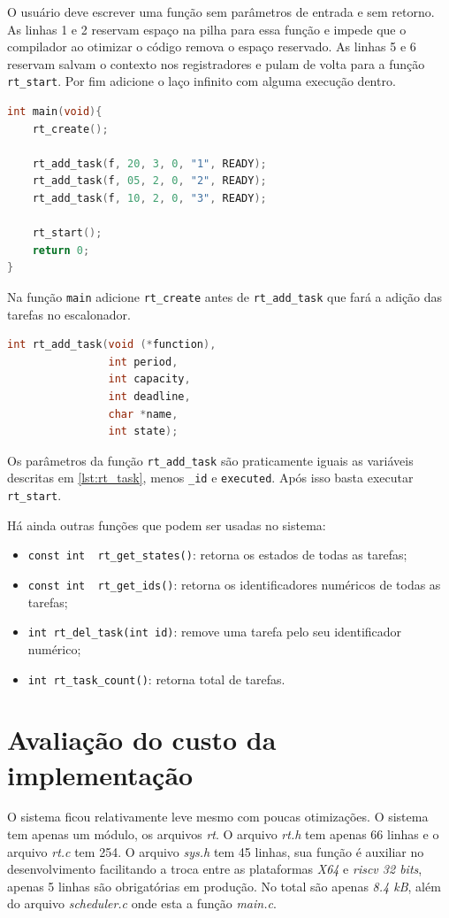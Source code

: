 \documentclass[a4 paper]{article}
\begin{document}
O usuário deve escrever uma função sem parâmetros de entrada e sem retorno. As linhas 1 e 2 reservam espaço na pilha para essa função e impede que o compilador ao otimizar o código remova o espaço reservado. As linhas 5 e 6 reservam salvam o contexto nos registradores e pulam de volta para a função \verb|rt_start|. Por fim adicione o laço infinito com alguma execução dentro.

\begin{lstlisting}[captionpos=b, language=C, caption=Exemplo de uso]
int main(void){
    rt_create();

    rt_add_task(f, 20, 3, 0, "1", READY);
    rt_add_task(f, 05, 2, 0, "2", READY);
    rt_add_task(f, 10, 2, 0, "3", READY);

    rt_start();
    return 0;
}
\end{lstlisting}

Na função \verb|main| adicione \verb|rt_create| antes de \verb|rt_add_task| que fará a adição das tarefas no escalonador.
\begin{lstlisting}[captionpos=b, language=C, caption=Função de adição das tarefas]
int rt_add_task(void (*function), 
                int period, 
                int capacity, 
                int deadline, 
                char *name,  
                int state);
\end{lstlisting}

Os parâmetros da função \verb|rt_add_task| são praticamente iguais as variáveis descritas em \ref{lst:rt_task}, menos \verb|_id| e \verb|executed|. Após isso basta executar \verb|rt_start|.

Há ainda outras funções que podem ser usadas no sistema:
\begin{itemize}
    \item \verb|const int  rt_get_states()|: retorna os estados de todas as tarefas;
    \item \verb|const int  rt_get_ids()|: retorna os identificadores numéricos de todas as tarefas;
    \item \verb|int rt_del_task(int id)|: remove uma tarefa pelo seu identificador numérico;
    \item \verb|int rt_task_count()|: retorna total de tarefas.
\end{itemize}

\section{Avaliação do custo da implementação}
O sistema ficou relativamente leve mesmo com poucas otimizações. O sistema tem apenas um módulo, os arquivos \textit{rt}. O arquivo \textit{rt.h} tem apenas 66 linhas e o arquivo \textit{rt.c} tem 254. O arquivo \textit{sys.h} tem 45 linhas, sua função é auxiliar no desenvolvimento facilitando a troca entre as plataformas \textit{X64} e \textit{riscv 32 bits}, apenas 5 linhas são obrigatórias em produção. No total são apenas \textit{8.4 kB}, além do arquivo \textit{scheduler.c} onde esta a função \textit{main.c}.

\end{document}
